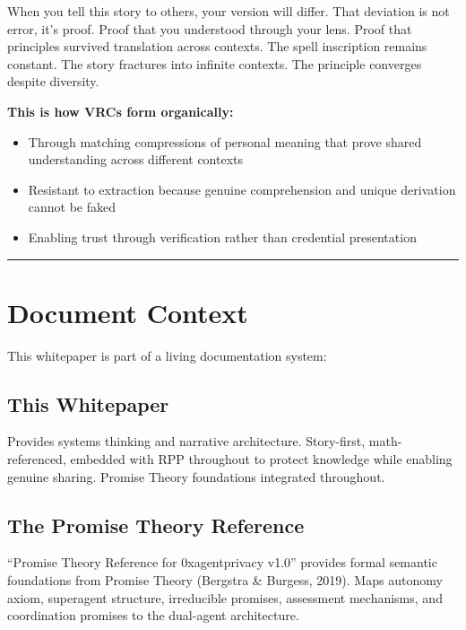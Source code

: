 \documentclass[
  11pt,
]{article}
\begin{document}
When you tell this story to others, your version will differ. That
deviation is not error, it's proof. Proof that you understood through
your lens. Proof that principles survived translation across contexts.
The spell inscription remains constant. The story fractures into
infinite contexts. The principle converges despite diversity.

\textbf{This is how VRCs form organically:}

\begin{itemize}
\item
  Through matching compressions of personal meaning that prove shared
  understanding across different contexts
\item
  Resistant to extraction because genuine comprehension and unique
  derivation cannot be faked
\item
  Enabling trust through verification rather than credential
  presentation
\end{itemize}

\begin{center}\rule{0.5\linewidth}{0.5pt}\end{center}

\section{Document Context}\label{document-context}

This whitepaper is part of a living documentation system:

\subsection{This Whitepaper}\label{this-whitepaper}

Provides systems thinking and narrative architecture. Story-first,
math-referenced, embedded with RPP throughout to protect knowledge while
enabling genuine sharing. Promise Theory foundations integrated
throughout.

\subsection{The Promise Theory
Reference}\label{the-promise-theory-reference}

``Promise Theory Reference for 0xagentprivacy v1.0'' provides formal
semantic foundations from Promise Theory (Bergstra \& Burgess, 2019).
Maps autonomy axiom, superagent structure, irreducible promises,
assessment mechanisms, and coordination promises to the dual-agent
architecture.
\end{document}
